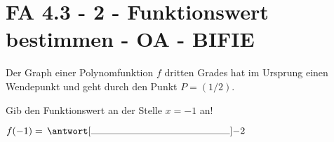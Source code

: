 \section{FA 4.3 - 2 - Funktionswert bestimmen - OA - BIFIE}

\begin{beispiel}[FA 4.3]{1} %
				Der Graph einer Polynomfunktion $f$ dritten Grades hat im Ursprung einen Wendepunkt und geht durch den Punkt $P=(1/2)$.

Gib den Funktionswert an der Stelle $x=-1$ an!
\leer

$f(-1)=\,\antwort[\rule{5cm}{0.3pt}]{-2}$
\end{beispiel}